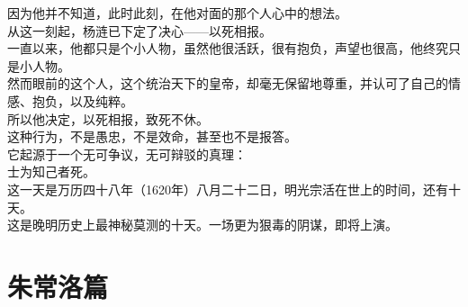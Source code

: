 \begin{multicols}{\theparacolNo}
因为他并不知道，此时此刻，在他对面的那个人心中的想法。\\

从这一刻起，杨涟已下定了决心——以死相报。\\

一直以来，他都只是个小人物，虽然他很活跃，很有抱负，声望也很高，他终究只是小人物。\\

然而眼前的这个人，这个统治天下的皇帝，却毫无保留地尊重，并认可了自己的情感、抱负，以及纯粹。\\

所以他决定，以死相报，致死不休。\\

这种行为，不是愚忠，不是效命，甚至也不是报答。\\

它起源于一个无可争议，无可辩驳的真理：\\

士为知己者死。\\

这一天是万历四十八年（1620年）八月二十二日，明光宗活在世上的时间，还有十天。\\

这是晚明历史上最神秘莫测的十天。一场更为狠毒的阴谋，即将上演。\\
\ifnum{}
	\end{multicols}
\fi
\newpage

\chapter*{朱常洛篇}
